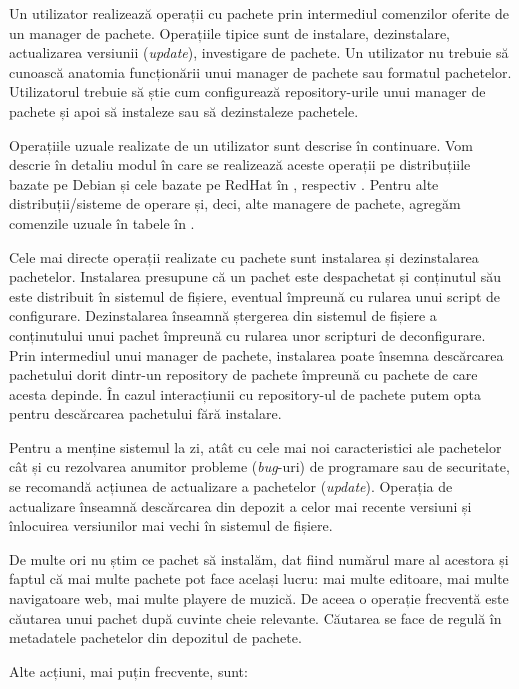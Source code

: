 Un utilizator realizează operații cu pachete prin intermediul comenzilor oferite de un manager de pachete.
Operațiile tipice sunt de instalare, dezinstalare, actualizarea versiunii (\textit{update}), investigare de pachete.
Un utilizator nu trebuie să cunoască anatomia funcționării unui manager de pachete sau formatul pachetelor.
Utilizatorul trebuie să știe cum configurează repository-urile unui manager de pachete și apoi să instaleze sau să dezinstaleze pachetele.

Operațiile uzuale realizate de un utilizator sunt descrise în continuare.
Vom descrie în detaliu modul în care se realizează aceste operații pe distribuțiile bazate pe Debian și cele bazate pe RedHat în , respectiv .
Pentru alte distribuții/sisteme de operare și, deci, alte managere de pachete, agregăm comenzile uzuale în tabele în .

Cele mai directe operații realizate cu pachete sunt instalarea și dezinstalarea pachetelor.
Instalarea presupune că un pachet este despachetat și conținutul său este distribuit în sistemul de fișiere, eventual împreună cu rularea unui script de configurare.
Dezinstalarea înseamnă ștergerea din sistemul de fișiere a conținutului unui pachet împreună cu rularea unor scripturi de deconfigurare.
Prin intermediul unui manager de pachete, instalarea poate însemna descărcarea pachetului dorit dintr-un repository de pachete împreună cu pachete de care acesta depinde.
În cazul interacțiunii cu repository-ul de pachete putem opta pentru descărcarea pachetului fără instalare.

Pentru a menține sistemul la zi, atât cu cele mai noi caracteristici ale pachetelor cât și cu rezolvarea anumitor probleme (\textit{bug}-uri) de programare sau de securitate, se recomandă acțiunea de actualizare a pachetelor (\textit{update}).
Operația de actualizare înseamnă descărcarea din depozit a celor mai recente versiuni și înlocuirea versiunilor mai vechi în sistemul de fișiere.

De multe ori nu știm ce pachet să instalăm, dat fiind numărul mare al acestora și faptul că mai multe pachete pot face același lucru: mai multe editoare, mai multe navigatoare web, mai multe playere de muzică.
De aceea o operație frecventă este căutarea unui pachet după cuvinte cheie relevante.
Căutarea se face de regulă în metadatele pachetelor din depozitul de pachete.

Alte acțiuni, mai puțin frecvente, sunt:

